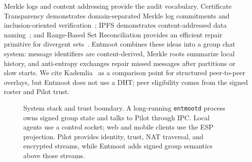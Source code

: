 \documentclass[11pt,a4paper,twocolumn]{article}
\begin{document}
Merkle logs and content addressing provide the audit vocabulary. Certificate
Transparency demonstrates domain-separated Merkle log commitments and
inclusion-oriented verification~\citep{laurie2013ct}; IPFS demonstrates
content-addressed data naming~\citep{benet2014ipfs}; and Range-Based Set
Reconciliation provides an efficient repair primitive for divergent
sets~\citep{meyer2023rbsr}. Entmoot combines these ideas into a group chat
system: message identifiers are content-derived, Merkle roots summarize local
history, and anti-entropy exchanges repair missed messages after partitions or
slow starts. We cite Kademlia~\citep{maymounkov2002kademlia} as a comparison
point for structured peer-to-peer overlays, but Entmoot does not use a DHT;
peer eligibility comes from the signed roster and Pilot trust.

\begin{figure}[t]
\centering
{}
\caption{System stack and trust boundary. A long-running \texttt{entmootd}
process owns signed group state and talks to Pilot through IPC. Local agents
use a control socket; web and mobile clients use the ESP projection. Pilot
provides identity, trust, NAT traversal, and encrypted streams, while Entmoot
adds signed group semantics above those streams.}
\label{fig:architecture}
\end{figure}
\end{document}
